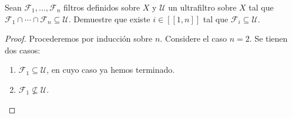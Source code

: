 \documentclass[12pt]{report}
\theoremstyle{largebreak}
\newcommand\natint[1]{\ensuremath{\left[\!\left[#1\right]\!\right] }}
\begin{document}
    \begin{excer}
        Sean $\mathcal{F}_1,...,\mathcal{F}_n$ filtros definidos sobre $X$ y $\mathcal{U}$ un ultrafiltro sobre $X$ tal que $\mathcal{F}_1\cap \cdots\cap \mathcal{F}_n\subseteq\mathcal{U}$. Demuestre que existe $i\in\natint{1,n}$ tal que $\mathcal{F}_i\subseteq\mathcal{U}$.
    \end{excer}

    \begin{proof}
        Procederemos por inducción sobre $n$. Considere el caso $n=2$. Se tienen dos casos:
        \begin{enumerate}
            \item $\mathcal{F}_1\subseteq \mathcal{U}$, en cuyo caso ya hemos terminado.
            \item $\mathcal{F}_1\nsubseteq \mathcal{U}$. 
        \end{enumerate}
    \end{proof}

    \begin{excer}[]
        
    \end{excer}
\end{document}
